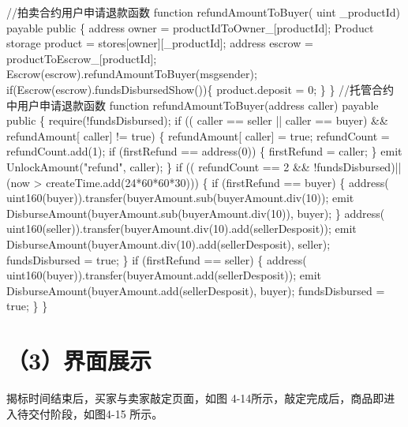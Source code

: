 \documentclass[
  10
]{article}
\newenvironment{Shaded}{}{}
\newcommand{\NormalTok}[1]{#1}
\begin{document}
\begin{Shaded}
\begin{Highlighting}[]
\NormalTok{//拍卖合约用户申请退款函数  }
\NormalTok{function refundAmountToBuyer( uint \_productId) payable public \{  }
\NormalTok{    address owner = productIdToOwner\_[productId];  }
\NormalTok{    Product storage product = stores[owner][\_productId];  }
\NormalTok{    address escrow = productToEscrow\_[productId];  }
\NormalTok{    Escrow(escrow).refundAmountToBuyer(msgsender);  }
\NormalTok{    if(Escrow(escrow).fundsDisbursedShow())\{  }
\NormalTok{        product.deposit = 0;  }
\NormalTok{    \}  }
\NormalTok{\}  }
\NormalTok{//托管合约中用户申请退款函数  }
\NormalTok{function refundAmountToBuyer(address caller) payable public \{  }
\NormalTok{    require(!fundsDisbursed);  }
\NormalTok{    if (( caller == seller || caller == buyer) \&\& refundAmount[ caller] != true) \{  }
\NormalTok{        refundAmount[ caller] = true;  }
\NormalTok{        refundCount = refundCount.add(1);  }
\NormalTok{        if (firstRefund == address(0)) \{  }
\NormalTok{            firstRefund = caller;  }
\NormalTok{        \}  }
\NormalTok{        emit UnlockAmount("refund", caller);  }
\NormalTok{    \}  }
\NormalTok{    if (( refundCount == 2 \&\& !fundsDisbursed)||(now \textgreater{} createTime.add(24*60*60*30))) \{  }
\NormalTok{        if (firstRefund == buyer) \{  }
\NormalTok{            address( uint160(buyer)).transfer(buyerAmount.sub(buyerAmount.div(10));  }
\NormalTok{            emit DisburseAmount(buyerAmount.sub(buyerAmount.div(10)), buyer);  }
\NormalTok{        \}  }
\NormalTok{        address( uint160(seller)).transfer(buyerAmount.div(10).add(sellerDesposit));  }
\NormalTok{        emit DisburseAmount(buyerAmount.div(10).add(sellerDesposit), seller);  }
\NormalTok{        fundsDisbursed = true;  }
\NormalTok{    \}  }
\NormalTok{    if (firstRefund == seller) \{  }
\NormalTok{        address( uint160(buyer)).transfer(buyerAmount.add(sellerDesposit));  }
\NormalTok{        emit DisburseAmount(buyerAmount.add(sellerDesposit), buyer);  }
\NormalTok{        fundsDisbursed = true;  }
\NormalTok{    \}  }
\NormalTok{\}}
\end{Highlighting}
\end{Shaded}

\section{（3）界面展示}\label{ux754cux9762ux5c55ux793a-4}

揭标时间结束后，买家与卖家敲定页面，如图
4-14所示，敲定完成后，商品即进入待交付阶段，如图4-15 所示。
\end{document}
